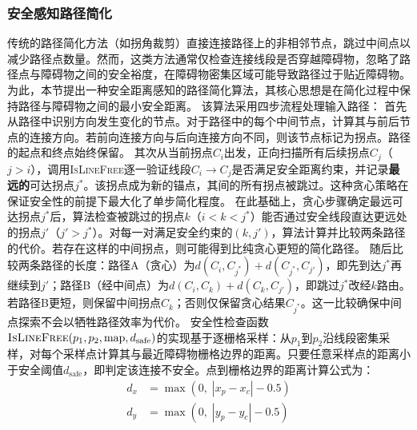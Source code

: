 \documentclass[lettersize,journal]{IEEEtran}
\begin{document}
\subsubsection{安全感知路径简化}
传统的路径简化方法（如拐角裁剪）直接连接路径上的非相邻节点，跳过中间点以减少路径点数量。然而，这类方法通常仅检查连接线段是否穿越障碍物，忽略了路径点与障碍物之间的安全裕度，在障碍物密集区域可能导致路径过于贴近障碍物。为此，本节提出一种安全距离感知的路径简化算法，其核心思想是在简化过程中保持路径与障碍物之间的最小安全距离。
该算法采用四步流程处理输入路径：
首先从路径中识别方向发生变化的节点。对于路径中的每个中间节点，计算其与前后节点的连接方向。若前向连接方向与后向连接方向不同，则该节点标记为拐点。路径的起点和终点始终保留。
其次从当前拐点$C_i$出发，正向扫描所有后续拐点$C_j$（$j > i$），调用\textsc{IsLineFree}逐一验证线段$C_i \to C_j$是否满足安全距离约束，并记录\textbf{最远的}可达拐点$j^{*}$。该拐点成为新的锚点，其间的所有拐点被跳过。这种贪心策略在保证安全性的前提下最大化了单步简化程度。
在此基础上，贪心步骤确定最远可达拐点$j^{*}$后，算法检查被跳过的拐点$k$（$i < k < j^{*}$）能否通过安全线段直达更远处的拐点$j'$（$j' > j^{*}$）。对每一对满足安全约束的$(k, j')$，算法计算并比较两条路径的代价。若存在这样的中间拐点，则可能得到比纯贪心更短的简化路径。
随后比较两条路径的长度：路径A（贪心）为$d(C_i, C_{j^{*}}) + d(C_{j^{*}}, C_{j'})$，即先到达$j^{*}$再继续到$j'$；路径B（经中间点）为$d(C_i, C_k) + d(C_k, C_{j'})$，即跳过$j^{*}$改经$k$路由。若路径B更短，则保留中间拐点$C_k$；否则仅保留贪心结果$C_{j^{*}}$。这一比较确保中间点探索不会以牺牲路径效率为代价。
安全性检查函数$\textsc{IsLineFree}(p_1, p_2, \mathrm{map}, d_{\mathrm{safe}})$的实现基于逐栅格采样：从$p_1$到$p_2$沿线段密集采样，对每个采样点计算其与最近障碍物栅格边界的距离。只要任意采样点的距离小于安全阈值$d_{\mathrm{safe}}$，即判定该连接不安全。点到栅格边界的距离计算公式为：
\begin{equation}
\begin{split}
d_x &= \max\left(0,\; |x_p - x_c| - 0.5\right)\\
d_y &= \max\left(0,\; |y_p - y_c| - 0.5\right)
\end{split}
\label{eq:dxymax}
\end{equation}
\end{document}
